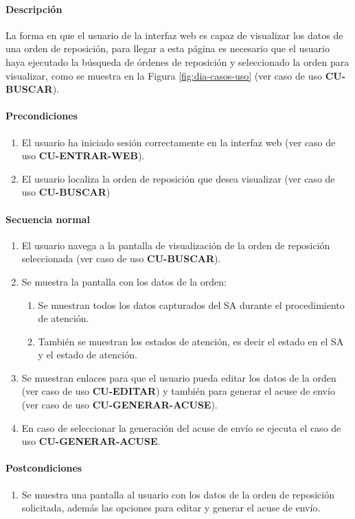 \paragraph*{Descripción}
La forma en que el usuario de la interfaz web es capaz de visualizar los datos de una orden de reposición, para llegar a esta página es necesario que el usuario haya ejecutado la búsqueda de órdenes de reposición y seleccionado la orden para visualizar, como se muestra en la Figura \ref{fig:dia-casos-uso} (ver caso de uso \textbf{CU-BUSCAR}).
\paragraph*{Precondiciones}
\begin{enumerate}
  \item El usuario ha iniciado sesión correctamente en la interfaz web (ver caso de uso \textbf{CU-ENTRAR-WEB}).
  \item El usuario localiza la orden de reposición que desea visualizar (ver caso de uso \textbf{CU-BUSCAR})
\end{enumerate}
\paragraph*{Secuencia normal}
\begin{enumerate}
  \item El usuario navega a la pantalla de visualización de la orden de reposición seleccionada (ver caso de uso \textbf{CU-BUSCAR}).
  \item Se muestra la pantalla con los datos de la orden:
  \begin{enumerate}
    \item Se muestran todos los datos capturados del SA durante el procedimiento de atención.
    \item También se muestran los estados de atención, es decir el estado en el SA  y el estado de atención.
  \end{enumerate}
  \item Se muestran enlaces para que el usuario pueda editar los datos de la orden (ver caso de uso \textbf{CU-EDITAR}) y también para generar el acuse de envío (ver caso de uso \textbf{CU-GENERAR-ACUSE}).
  \item En caso de seleccionar la generación del acuse de envío se ejecuta el caso de uso \textbf{CU-GENERAR-ACUSE}.
\end{enumerate}
\paragraph*{Postcondiciones}
\begin{enumerate}
  \item Se muestra una pantalla al usuario con los datos de la orden de reposición solicitada, además las opciones para editar y generar el acuse de envío.
\end{enumerate}
